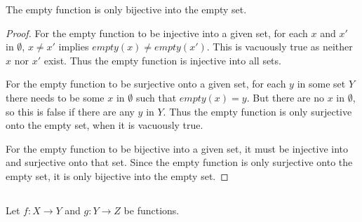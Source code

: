 \documentclass[../../main.tex]{subfiles}
\begin{document}
\begin{ans}
    The empty function is only bijective into the empty set.
\end{ans}

\begin{proof}
    For the empty function to be injective into a given set, for each $x$ and $x'$ in $\emptyset$, $x \neq x'$ implies $empty(x) \neq empty(x')$.
    This is vacuously true as neither $x$ nor $x'$ exist.
    Thus the empty function is injective into all sets.
    
    For the empty function to be surjective onto a given set, for each $y$ in some set $Y$ there needs to be some $x$ in $\emptyset$ such that $empty(x)=y$.
    But there are no $x$ in $\emptyset$, so this is false if there are any $y$ in $Y$.
    Thus the empty function is only surjective onto the empty set, when it is vacuously true.
    
    For the empty function to be bijective into a given set, it must be injective into and surjective onto that set. Since the empty function is only surjective onto the empty set, it is only bijective into the empty set.
\end{proof}

\subsection{}
\begin{q}
Let $f: X \to Y$ and $g: Y \to Z$ be functions.
\end{q}
\end{document}
